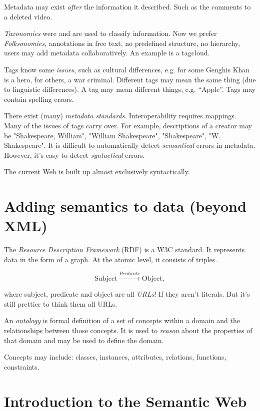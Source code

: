 \documentclass{report}
\begin{document}
Metadata may exist \emph{after} the information it described.
Such as the comments to a deleted video.

\emph{Taxonomies} were and are used to classify information.
Now we prefer \emph{Folksonomies}, annotations in free text,
no predefined structure, no hierarchy,
users may add metadata collaboratively.
An example is a tagcloud.

Tags know some \emph{issues}, such as cultural differences,
e.g. for some Genghis Khan is a hero, for others, a war criminal.
Different tags may mean the same thing
(due to linguistic differences).
A tag may mean different things, e.g. ``Apple''.
Tags may contain spelling errors.

There exist (many) \emph{metadata standards}.
Interoperability requires mappings.
Many of the issues of tags carry over.
For example, descriptions of a creator may be
"Shakespeare, William", "William Shakespeare",
"Shakespeare", "W. Shakespeare".
It is difficult to automatically detect
\emph{semantical} errors in metadata.
However, it's easy to detect \emph{syntactical} errors.

The current Web is built up
almost exclusively syntactically.

\section{Adding semantics to data (beyond XML)}

The \emph{Resource Description Framework} (RDF) is a W3C standard.
It represents data in the form of a graph.
At the atomic level, it consists of triples.

$$\text{Subject} \xrightarrow{Predicate} \text{Object},$$

where subject, predicate and object are all \emph{URLs}!
If they aren't literals.
But it's still prettier to think them all URLs.

An \emph{ontology} is formal definition
of a set of concepts within a domain
and the relationships between those concepts.
It is used to \emph{reason}
about the properties of that domain
and may be used to define the domain.

Concepts may include:
classes, instances, attributes,
relations, functions, constraints.

\section{Introduction to the Semantic Web}
\end{document}
